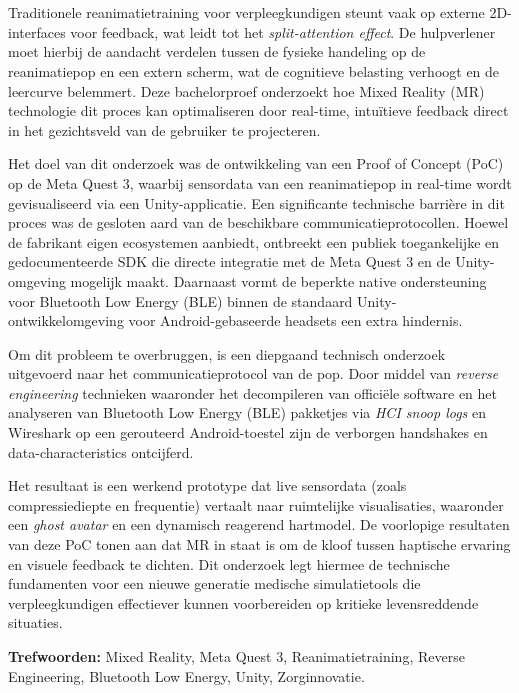 \chapter*{}

Traditionele reanimatietraining voor verpleegkundigen steunt vaak op externe 2D-interfaces voor feedback, wat leidt tot het \textit{split-attention effect}. 
De hulpverlener moet hierbij de aandacht verdelen tussen de fysieke handeling op de reanimatiepop en een extern scherm, wat de cognitieve belasting verhoogt en de 
leercurve belemmert. Deze bachelorproef onderzoekt hoe Mixed Reality (MR) technologie dit proces kan optimaliseren door real-time, intuïtieve feedback direct in het 
gezichtsveld van de gebruiker te projecteren.

Het doel van dit onderzoek was de ontwikkeling van een Proof of Concept (PoC) op de Meta Quest 3, 
waarbij sensordata van een reanimatiepop in real-time wordt gevisualiseerd via een Unity-applicatie. 
Een significante technische barrière in dit proces was de gesloten aard van de beschikbare communicatieprotocollen.
Hoewel de fabrikant eigen ecosystemen aanbiedt, ontbreekt een publiek toegankelijke en gedocumenteerde SDK die directe 
integratie met de Meta Quest 3 en de Unity-omgeving mogelijk maakt. Daarnaast vormt de beperkte native ondersteuning voor Bluetooth Low Energy (BLE) 
binnen de standaard Unity-ontwikkelomgeving voor Android-gebaseerde headsets een extra hindernis.

Om dit probleem te overbruggen, is een diepgaand technisch onderzoek uitgevoerd naar het communicatieprotocol van de pop. 
Door middel van \textit{reverse engineering} technieken waaronder het decompileren van officiële software en het analyseren van 
Bluetooth Low Energy (BLE) pakketjes via \textit{HCI snoop logs} en Wireshark op een gerouteerd Android-toestel zijn de verborgen 
handshakes en data-characteristics ontcijferd. 

Het resultaat is een werkend prototype dat live sensordata (zoals compressiediepte en frequentie) vertaalt naar ruimtelijke 
visualisaties, waaronder een \textit{ghost avatar} en een dynamisch reagerend hartmodel. De voorlopige resultaten van deze PoC 
tonen aan dat MR in staat is om de kloof tussen haptische ervaring en visuele feedback te dichten. Dit onderzoek legt hiermee de 
technische fundamenten voor een nieuwe generatie medische simulatietools die verpleegkundigen effectiever kunnen voorbereiden op kritieke levensreddende situaties.

\textbf{Trefwoorden:} Mixed Reality, Meta Quest 3, Reanimatietraining, Reverse Engineering, Bluetooth Low Energy, Unity, Zorginnovatie.